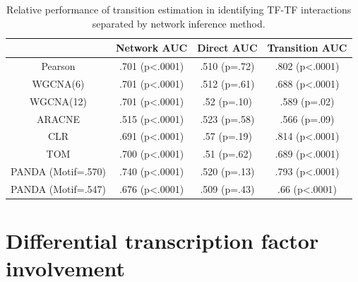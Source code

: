 \documentclass[english]{article}
\providecommand{\tabularnewline}{\\}
\begin{document}
{\small

\begin{table}
\begin{tabular}{|c|c|c|c|}
\multicolumn{1}{c}{} & \multicolumn{1}{c}{Network AUC} & \multicolumn{1}{c}{Direct AUC} & \multicolumn{1}{c}{Transition AUC}\tabularnewline
\hline 
Pearson & .701 (p<.0001) & .510 (p=.72) & .802 (p<.0001)\tabularnewline
\hline 
WGCNA(6) & .701 (p<.0001) & .512 (p=.61) & .688 (p<.0001)\tabularnewline
\hline 
WGCNA(12) & .701 (p<.0001) & .52 (p=.10) & .589 (p=.02)\tabularnewline
\hline 
ARACNE & .515 (p<.0001) & .523 (p=.58) & .566 (p=.09)\tabularnewline
\hline 
CLR & .691 (p<.0001) & .57 (p=.19) & .814 (p<.0001)\tabularnewline
\hline 
TOM & .700 (p<.0001) & .51 (p=.62) & .689 (p<.0001)\tabularnewline
\hline 
PANDA (Motif=.570) & .740 (p<.0001) & .520 (p=.13) & .793 (p<.0001)\tabularnewline
\hline 
PANDA (Motif=.547) & .676 (p<.0001) & .509 (p=.43)  & .66 (p<.0001) \tabularnewline
\hline 
\end{tabular}\caption{Relative performance of transition estimation in identifying TF-TF
interactions separated by network inference method.}
\end{table}


}


\section*{Differential transcription factor involvement}
\end{document}
